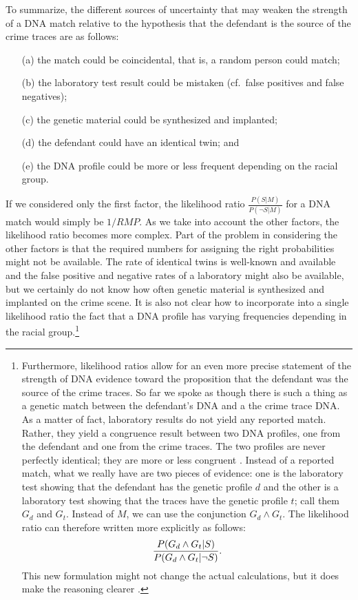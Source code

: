 \documentclass[10pt]{article}
\begin{document}
To summarize, the different sources of uncertainty that may weaken the strength of a 
DNA match relative to the hypothesis that the defendant is the source of the crime traces are as follows:
%
\begin{itemize}
\item[(a)] the match could be coincidental, that is, a random person could match;
\item[(b)] the laboratory test result could be mistaken (cf.\ false positives and false negatives);
\item[(c)] the genetic material could be synthesized and implanted; 
\item[(d)] the defendant could have an identical twin; and
\item[(e)] the DNA profile could be more or less frequent depending on the racial group.
\end{itemize}
%
If we considered only the first factor, the likelihood ratio $\frac{P(S| M)}{P(\neg S | M)}$ for a 
DNA match would simply be $1/RMP$. As we take into account the other factors, 
the likelihood ratio becomes more complex. Part of the problem in considering the other factors 
is that the required numbers for assigning the right probabilities  might not be available. The rate of identical twins is well-known and available and 
the false positive and negative rates of a laboratory might also be available, 
but we certainly do not know how often genetic material is synthesized 
and implanted on the crime scene. It is also not clear how to incorporate into 
a single likelihood ratio the fact that a DNA profile has varying frequencies 
depending in the racial group.\footnote{Furthermore, likelihood ratios allow for an even more precise statement of the strength 
of DNA evidence toward the proposition that the defendant was the source of the crime traces. 
So far we spoke as though there is such a thing as a genetic match between the defendant's DNA and a the crime trace DNA. 
As a matter of fact, laboratory results do not yield any reported match. Rather, they yield a 
congruence result between two DNA profiles, one from the defendant and one from the crime traces.
The two profiles are never perfectly identical; they are more or less congruent \citep{Kaye1993Dna}. Instead of a reported match, what we really have 
are two pieces of evidence: one is the laboratory test showing that the defendant has the genetic profile $d$ 
and the other is a laboratory test showing that the traces have the genetic profile $t$; call them 
$G_d$ and $G_t$. Instead of $M$, we can use the conjunction $G_d \wedge G_t$. 
The likelihood ratio can therefore written more explicitly as follows:
%
\[
{P(G_d \wedge G_t | S) \over P(G_d \wedge G_t | \neg S)}.
\]
%
This new formulation might not change the actual calculations, but 
it does make the reasoning clearer \citep{Robertson1995DNA-Evidence:-W}.}
\end{document}
